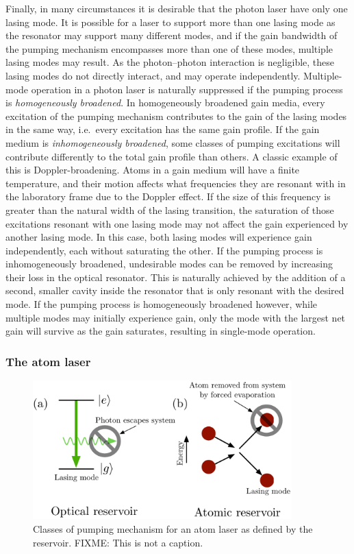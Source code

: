 Finally, in many circumstances it is desirable that the photon laser have only one lasing mode.  It is possible for a laser to support more than one lasing mode as the resonator may support many different modes, and if the gain bandwidth of the pumping mechanism encompasses more than one of these modes, multiple lasing modes may result.  As the photon--photon interaction is negligible, these lasing modes do not directly interact, and may operate independently.  Multiple-mode operation in a photon laser is naturally suppressed if the pumping process is \emph{homogeneously broadened}.  In homogeneously broadened gain media, every excitation of the pumping mechanism contributes to the gain of the lasing modes in the same way, i.e.\ every excitation has the same gain profile.  If the gain medium is \emph{inhomogeneously broadened}, some classes of pumping excitations will contribute differently to the total gain profile than others.  A classic example of this is Doppler-broadening.  Atoms in a gain medium will have a finite temperature, and their motion affects what frequencies they are resonant with in the laboratory frame due to the Doppler effect.  If the size of this frequency is greater than the natural width of the lasing transition, the saturation of those excitations resonant with one lasing mode may not affect the gain experienced by another lasing mode.  In this case, both lasing modes will experience gain independently, each without saturating the other.  If the pumping process is inhomogeneously broadened, undesirable modes can be removed by increasing their loss in the optical resonator.  This is naturally achieved by the addition of a second, smaller cavity inside the resonator that is only resonant with the desired mode.  If the pumping process is homogeneously broadened however, while multiple modes may initially experience gain, only the mode with the largest net gain will survive as the gain saturates, resulting in single-mode operation.


\subsubsection{The atom laser}

\begin{figure}
    \centering
    \includegraphics[width=10cm]{ReservoirChoices}
    \caption{
        \label{Introduction:ReservoirChoices}
        Classes of pumping mechanism for an atom laser as defined by the reservoir. FIXME: This is not a caption.
    }
\end{figure}

